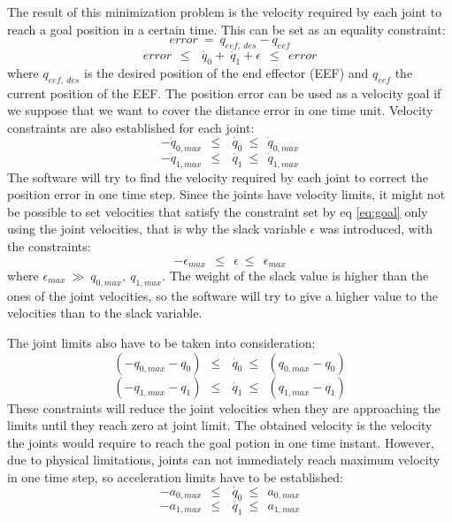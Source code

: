 The result of this minimization problem is the velocity required by each joint to reach a goal position in a certain time. This can be set as an equality constraint:
\begin{equation}
error\ =\ q_{eef,\ des} - q_{eef}
\label{eq:init_error}
\end{equation}
\begin{equation}
error\ \ \leq\ \ \dot{\ q_{0}} + \dot{\ q_{1}} + \epsilon\ \ \leq\ \ error
\label{eq:goal}
\end{equation}
where $q_{eef,\ des}$ is the desired position of the end effector (EEF) and $q_{eef}$ the current position of the EEF. The position error can be used as a velocity goal if we suppose that we want to cover the distance error in one time unit. Velocity constraints are also established for each joint:
\begin{equation}
-\dot{q}_{0,max}\ \ \leq\ \ \dot{\ q_{0}}\ \leq\ \ \dot{q}_{0,max}
\end{equation}
\begin{equation}
-\dot{q}_{1,max}\ \ \leq\ \ \dot{\ q_{1}}\ \leq\ \ \dot{q}_{1,max}
\end{equation}
The software will try to find the velocity required by each joint to correct the position error in one time step. Since the joints have velocity limits, it might not be possible to set velocities that satisfy the constraint set by eq \ref{eq:goal} only using the joint velocities, that is why the slack variable $\epsilon$ was introduced, with the constraints: 
\begin{equation}
-\epsilon_{max}\ \ \leq\ \ \epsilon\ \leq\ \ \epsilon_{max}
\end{equation}
where $\epsilon_{max}\ \gg\ q_{0,max},\ q_{1,max}$. The weight of the slack value is higher than the ones of the joint velocities, so the software will try to give a higher value to the velocities than to the slack variable.

The joint limits also have to be taken into consideration:
\begin{equation}
(-q_{0,max} - q_{0})\ \ \leq\ \ \dot{\ q_{0}}\ \leq\ \ (q_{0,max} - q_{0})
\end{equation}
\begin{equation}
(-q_{1,max} - q_{1})\ \ \leq\ \ \dot{\ q_{1}}\ \leq\ \ (q_{1,max} - q_{1})
\end{equation}
These constraints will reduce the joint velocities when they are approaching the limits until they reach zero at joint limit. The obtained velocity is the velocity the joints would require to reach the goal potion in one time instant. However, due to physical limitations, joints can not immediately reach maximum velocity in one time step, so acceleration limits have to be established:
\begin{equation}
-a_{0,max}\ \ \leq\ \ \dot{\ q_{0}}\ \leq\ \ a_{0,max}
\label{eq:accel0}
\end{equation}
\begin{equation}
-a_{1,max}\ \ \leq\ \ \dot{\ q_{1}}\ \leq\ \ a_{1,max}
\label{eq:accel1}
\end{equation}

